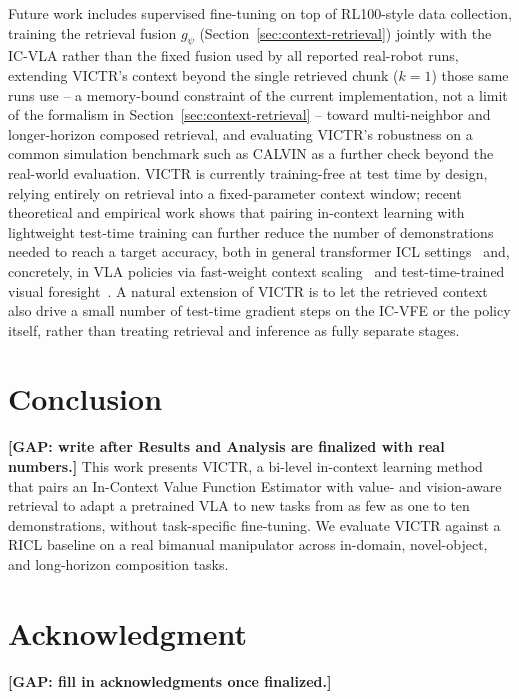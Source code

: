 \documentclass[conference]{IEEEtran}
\providecommand{\gap}[1]{\textbf{[GAP: #1]}}
\newcommand{\method}{VICTR\xspace}
\begin{document}
Future work includes supervised fine-tuning on top of RL100-style data
collection, training the retrieval fusion $g_\psi$
(Section~\ref{sec:context-retrieval}) jointly with the IC-VLA rather than the
fixed fusion used by all reported real-robot runs, extending \method's
context beyond the single retrieved chunk ($k=1$) those same runs use -- a
memory-bound constraint of the current implementation, not a limit of the
formalism in Section~\ref{sec:context-retrieval} -- toward multi-neighbor and
longer-horizon composed retrieval, and evaluating \method's robustness on a
common simulation benchmark such as CALVIN as a further check beyond the
real-world evaluation. \method is currently training-free at test
time by design, relying entirely on retrieval into a fixed-parameter
context window; recent theoretical and empirical work shows that pairing
in-context learning with lightweight test-time training can further reduce
the number of demonstrations needed to reach a target accuracy, both in
general transformer ICL settings~\cite{ttt-icl-provably,ttt-fewshot} and,
concretely, in VLA policies via fast-weight context
scaling~\cite{robottt} and test-time-trained visual
foresight~\cite{ttt-visual-foresight}. A natural extension of \method is to
let the retrieved context also drive a small number of test-time gradient
steps on the IC-VFE or the policy itself, rather than treating retrieval and
inference as fully separate stages.

\section{Conclusion}
\label{sec:conclusion}

\gap{write after Results and Analysis are finalized with real numbers.} This
work presents \method, a bi-level in-context learning method that pairs an
In-Context Value Function Estimator with value- and vision-aware retrieval to
adapt a pretrained VLA to new tasks from as few as one to ten demonstrations,
without task-specific fine-tuning. We evaluate \method against a RICL
baseline on a real bimanual manipulator across in-domain,
novel-object, and long-horizon composition tasks.

\section*{Acknowledgment}
\gap{fill in acknowledgments once finalized.}




% 
\end{document}
